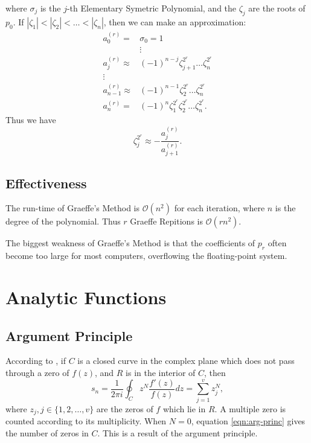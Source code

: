 \documentclass{article}
\begin{document}
where $\sigma_j$ is the $j$-th Elementary Symetric Polynomial\cite{wiki:symetric},
and the $\zeta_j$ are the roots of $p_0$.
If $|\zeta_1|<|\zeta_2|<\dots<|\zeta_n|$, then we can make an approximation:
\begin{equation}
	\begin{aligned}
		a_0^{(r)} =& \sigma_0 = 1 \\
		&\vdots \\
		a_j^{(r)} \approx& (-1)^{n-j}\zeta_{j+1}^{2^r}\dots\zeta_n^{2^r} \\
		\vdots \\
		a_{n-1}^{(r)} \approx& (-1)^{n-1}\zeta_2^{2^r}\dots\zeta_n^{2^r} \\
		a_n^{(r)} =& (-1)^n\zeta_1^{2^r}\zeta_2^{2^r}\dots\zeta_n^{2^r}.
	\end{aligned}
\end{equation}
Thus we have
\begin{equation}
	\zeta_j^{2^r}\approx-\frac{a_j^{(r)}}{a_{j+1}^{(r)}}.
\end{equation}

\subsection{Effectiveness}

The run-time of Graeffe's Method is $\mathcal{O}(n^2)$ for each iteration, where $n$ is the degree of the polynomial.
Thus $r$ Graeffe Repitions is $\mathcal{O}(rn^2)$.

The biggest weakness of Graeffe's Method is that the coefficients of $p_r$ often become too large for most computers, 
overflowing the floating-point system.




\section{Analytic Functions}

\subsection{Argument Principle}

According to \cite{delves1967numerical},
if $C$ is a closed curve in the complex plane which does not pass through a zero of $f(z)$, and $R$ is in the interior of $C$, 
then
\begin{equation}\label{eqn:arg-princ}
	s_n=\frac{1}{2\pi i}\oint_Cz^N\frac{f'(z)}{f(z)}dz=\sum_{j=1}^vz_j^N,
\end{equation}
where $z_j,j\in\{1,2,\dots,v\}$ are the zeros of $f$ which lie in $R$.
A multiple zero is counted according to its multiplicity.
When $N=0$, equation \ref{eqn:arg-princ} gives the number of zeros in $C$.
This is a result of the argument principle.\cite{wiki:argument-principle}
\end{document}
